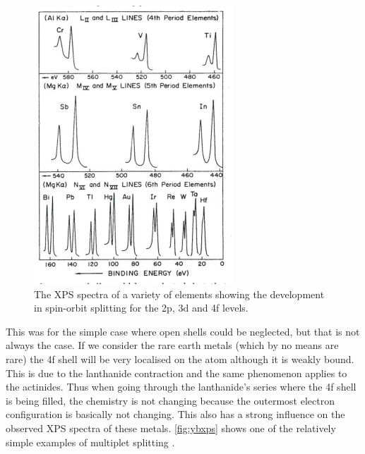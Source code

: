\begin{figure}[h!]
	\begin{center}
	\includegraphics[scale=4.5]{figures/04_09.png}
	\caption{The XPS spectra of a variety of elements showing the development in spin-orbit splitting for the 2p, 3d and 4f levels.}
	\label{fig:xpssplitting}
	\end{center}
\end{figure}

This was for the simple case where open shells could be neglected, but that is not always the case. If we consider the rare earth metals (which by no means are rare) the 4f shell will be very localised on the atom although it is weakly bound. This is due to the lanthanide contraction and the same phenomenon applies to the actinides. Thus when going through the lanthanide's series where the 4f shell is being filled, the chemistry is not changing because the outermost electron configuration is basically not changing. This also has a strong influence on the observed XPS spectra of these metals. \autoref{fig:ybxps} shows one of the relatively  simple examples of multiplet splitting \cite{chorkendorff}.

